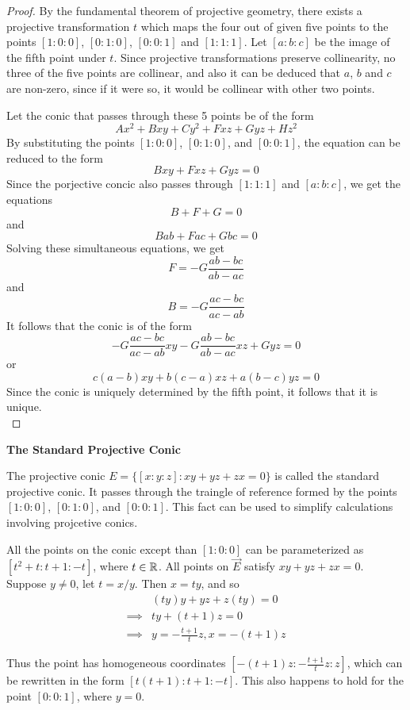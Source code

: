 \begin{proof}
 By the fundamental theorem of projective geometry, there exists a projective transformation
 $t$ which maps the four out of given five points to the points $[1:0:0]$, $[0:1:0]$, $[0:0:1]$
 and $[1:1:1]$. Let $[a:b:c]$ be the image of the fifth point under $t$. Since projective
 transformations preserve collinearity, no three of the five points are collinear, and also
 it can be deduced that $a$, $b$ and $c$ are non-zero, since if it were so, it would be collinear
 with other two points.

 \vspace{1ex}

 \noindent
 Let the conic that passes through these 5 points be of the form
 \[
   Ax^2+Bxy+Cy^2+Fxz+Gyz+Hz^2
 \]
 By substituting the points $[1:0:0]$, $[0:1:0]$, and $[0:0:1]$, the equation can be reduced
 to the form
 \[
   Bxy+Fxz+Gyz=0
 \]
 Since the porjective concic also passes through $[1:1:1]$ and $[a:b:c]$, we get the equations
 \[
   B+F+G=0
 \]
 and
 \[
   Bab+Fac+Gbc=0
 \]
 Solving these simultaneous equations, we get
 \[
   F=-G\frac{ab-bc}{ab-ac}
 \]
 and
 \[
   B= -G\frac{ac-bc}{ac-ab}
 \]
 It follows that the conic is of the form
 \[
   -G\frac{ac-bc}{ac-ab}xy-G\frac{ab-bc}{ab-ac}xz+Gyz=0
 \]
 or
 \[
   c(a-b)xy+b(c-a)xz+a(b-c)yz=0
 \]
 Since the conic is uniquely determined by the fifth point, it follows that it is unique.\\
\end{proof}

\begin{remark}
  \textbf{The Standard Projective Conic}

  The projective conic $E=\{[x:y:z]:xy+yz+zx=0\}$ is called the standard projective conic.
  It passes through the traingle of reference formed by the points $[1:0:0]$, $[0:1:0]$, and
  $[0:0:1]$. This fact can be used to simplify calculations involving projcetive conics.

  All the points on the conic except than $[1:0:0]$ can be parameterized as $[t^2+t:t+1:-t]$,
  where $t\in\mathbb{R}$. All points on $\vec{E}$ satisfy $xy+yz+zx=0$. Suppose $y\ne 0$, let $t=x/y$. Then
  $x=ty$, and so
  \begin{align*}
    & (ty)y+yz+z(ty)=0 \\
    \implies & ty+(t+1)z=0 \\
    \implies & y=-\frac{t+1}{t}z, x=-(t+1)z
  \end{align*}

  Thus the point has homogeneous coordinates $\left[-(t+1)z:-\frac{t+1}{t}z:z\right]$, which can
  be rewritten in the form $[t(t+1):t+1:-t]$. This also happens to hold for the point $[0:0:1]$,
  where $y=0$.
\end{remark}

